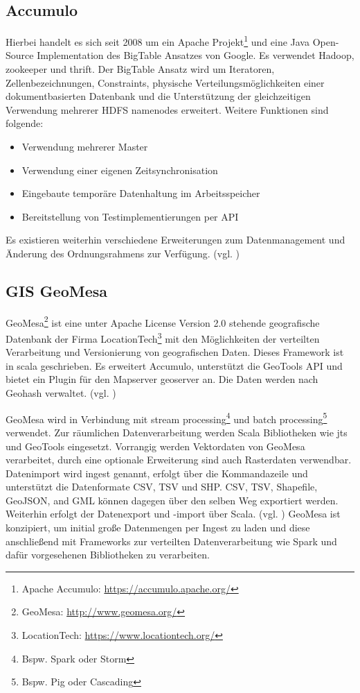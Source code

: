 \subsection{Accumulo}
\label{accumulo}
Hierbei handelt es sich seit 2008 um ein Apache Projekt\footnote{Apache Accumulo: \url{https://accumulo.apache.org/}} und eine Java Open-Source Implementation des BigTable Ansatzes von Google.
Es verwendet Hadoop, \Gls{zookeeper} und \Gls{thrift}.
Der BigTable Ansatz wird um Iteratoren, Zellenbezeichnungen, Constraints, physische Verteilungsmöglichkeiten einer dokumentbasierten Datenbank und die Unterstützung der gleichzeitigen Verwendung mehrerer HDFS namenodes erweitert.
Weitere Funktionen sind folgende:
\begin{itemize}
\item Verwendung mehrerer Master
\item Verwendung einer eigenen Zeitsynchronisation
\item Eingebaute temporäre Datenhaltung im Arbeitsspeicher
\item Bereitstellung von Testimplementierungen per API
\end {itemize}
Es existieren weiterhin verschiedene Erweiterungen zum Datenmanagement und Änderung des Ordnungsrahmens zur Verfügung. (vgl. \cite{website:accumulo_features})

\subsection{GIS GeoMesa}
GeoMesa\footnote{GeoMesa: \url{http://www.geomesa.org/}} ist eine unter Apache License Version 2.0 stehende geografische Datenbank der Firma LocationTech\footnote{LocationTech: \url{https://www.locationtech.org/}} mit den Möglichkeiten der verteilten Verarbeitung und Versionierung von geografischen Daten.
Dieses Framework ist in \Gls{scala} geschrieben.
Es erweitert Accumulo, unterstützt die GeoTools API und bietet ein Plugin für den Mapserver \Gls{geoserver} an.
Die Daten werden nach Geohash %
verwaltet. (vgl. \cite{website:geomesaeclipse})

GeoMesa wird in Verbindung mit stream processing\footnote{Bspw. Spark oder Storm} und batch processing\footnote{Bspw. Pig oder Cascading} verwendet.
Zur räumlichen Datenverarbeitung werden Scala Bibliotheken wie \Gls{jts} und GeoTools eingesetzt.
Vorrangig werden Vektordaten von GeoMesa verarbeitet, durch eine optionale Erweiterung sind auch Rasterdaten verwendbar.
Datenimport wird ingest genannt, erfolgt über die Kommandazeile und unterstützt die Datenformate CSV, TSV und SHP.
CSV, TSV, Shapefile, GeoJSON, and GML können dagegen über den selben Weg exportiert werden.
Weiterhin erfolgt der Datenexport und -import über Scala. (vgl. \cite{website:geomesa-ingest})
GeoMesa ist konzipiert, um initial große Datenmengen per Ingest zu laden und diese anschließend mit Frameworks zur verteilten Datenverarbeitung wie Spark und dafür vorgesehenen Bibliotheken zu verarbeiten.

